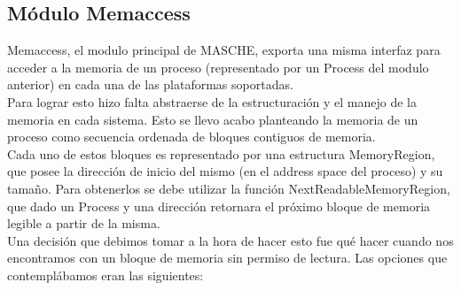 \subsection{Módulo Memaccess}

Memaccess, el modulo principal de MASCHE, exporta una misma interfaz para
acceder a la memoria de un proceso (representado por un Process del modulo
anterior) en cada una de las plataformas soportadas.\\

Para lograr esto hizo falta abstraerse de la estructuración y el manejo de la
memoria en cada sistema. Esto se llevo acabo planteando la memoria de un proceso
como secuencia ordenada de bloques contiguos de memoria.\\

Cada uno de estos bloques es representado por una estructura MemoryRegion, que
posee la dirección de inicio del mismo (en el address space del proceso) y su
tamaño. Para obtenerlos se debe utilizar la función NextReadableMemoryRegion,
que dado un Process y una dirección retornara el próximo bloque de memoria
legible a partir de la misma.\\

Una decisión que debimos tomar a la hora de hacer esto fue qué hacer cuando nos
encontramos con un bloque de memoria sin permiso de lectura. Las opciones que
contemplábamos eran las siguientes:

